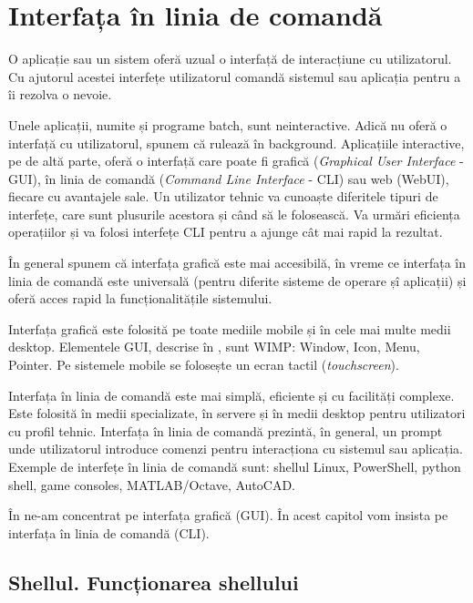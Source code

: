 \chapter{Interfața în linia de comandă}
\label{chapter:cli}

O aplicație sau un sistem oferă uzual o interfață de interacțiune cu
utilizatorul. Cu ajutorul acestei interfețe utilizatorul comandă sistemul sau aplicația pentru a îi rezolva o nevoie.

Unele aplicații, numite și programe batch, sunt neinteractive. Adică nu oferă o interfață cu utilizatorul, spunem că rulează în
background. Aplicațiile interactive, pe de altă parte, oferă o interfață care poate fi grafică (\textit{Graphical User Interface} - GUI), în linia de comandă (\textit{Command Line Interface} - CLI) sau web (WebUI), fiecare cu avantajele sale.
Un utilizator tehnic va cunoaște diferitele tipuri de interfețe, care sunt plusurile
acestora și când să le folosească. Va urmări eficiența operațiilor și va folosi
interfețe CLI pentru a ajunge cât mai rapid la rezultat.

În general spunem că interfața grafică este mai accesibilă, în vreme ce interfața în linia de comandă este universală (pentru diferite sisteme de operare șî aplicații) și oferă acces rapid la funcționalitățile sistemului.

Interfața grafică este folosită pe toate mediile mobile și în cele mai multe medii desktop. Elementele GUI, descrise în , sunt WIMP: Window, Icon, Menu, Pointer. Pe sistemele mobile se folosește un ecran tactil (\textit{touchscreen}).

Interfața în linia de comandă este mai simplă, eficiente și cu facilități complexe. Este folosită
în medii specializate, în servere și în medii desktop pentru utilizatori cu
profil tehnic. Interfața în linia de comandă prezintă, în general, un prompt unde utilizatorul introduce comenzi pentru interacționa cu sistemul sau aplicația. Exemple de interfețe în linia de comandă sunt: shellul Linux, PowerShell, python shell, game consoles,
MATLAB/Octave, AutoCAD.

În  ne-am concentrat pe interfața grafică (GUI). În acest capitol vom insista pe interfața în linia de comandă (CLI).

\section{Shellul. Funcționarea shellului}
\label{sec:cli:shell}

